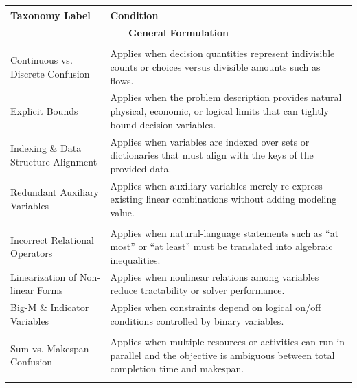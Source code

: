 \documentclass[sigconf, nonacm]{acmart}
\begin{document}
\begin{table}[!t]
\centering
\label{tab:taxonomy_library}
\small
\renewcommand{\arraystretch}{1.12}
\setlength{\tabcolsep}{3pt}
\begin{tabularx}{\textwidth}{l X}
\toprule
\textbf{Taxonomy Label} & \textbf{Condition} \\
\midrule

\multicolumn{2}{c}{\textbf{General Formulation}}\\
\addlinespace[3pt]

\multicolumn{2}{l}{\textbf{Variable Definition}}\\
Continuous vs. Discrete Confusion & Applies when decision quantities represent indivisible counts or choices versus divisible amounts such as flows. \\
Explicit Bounds & Applies when the problem description provides natural physical, economic, or logical limits that can tightly bound decision variables. \\
Indexing \& Data Structure Alignment & Applies when variables are indexed over sets or dictionaries that must align with the keys of the provided data. \\
Redundant Auxiliary Variables & Applies when auxiliary variables merely re-express existing linear combinations without adding modeling value. \\
\addlinespace[2pt]

\multicolumn{2}{l}{\textbf{Constraint Formulation}}\\
Incorrect Relational Operators & Applies when natural-language statements such as “at most” or “at least” must be translated into algebraic inequalities. \\
Linearization of Non-linear Forms & Applies when nonlinear relations among variables reduce tractability or solver performance. \\
Big-M \& Indicator Variables & Applies when constraints depend on logical on/off conditions controlled by binary variables. \\
\addlinespace[2pt]

\multicolumn{2}{l}{\textbf{Objective Specification}}\\
Sum vs. Makespan Confusion & Applies when multiple resources or activities can run in parallel and the objective is ambiguous between total completion time and makespan. \\
\addlinespace[2pt]


\end{tabularx}
\end{table}
\end{document}
